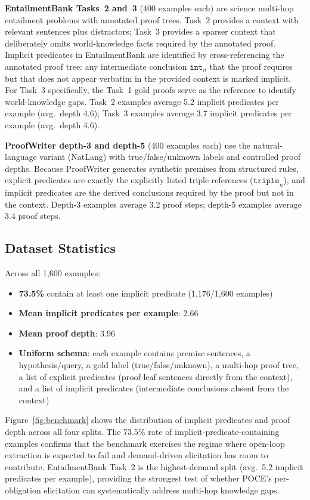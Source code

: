 \documentclass[11pt,letterpaper]{article}
\begin{document}
\textbf{EntailmentBank Tasks~2 and~3} \citep{Dalvi2021} (400 examples each) are science multi-hop
entailment problems with annotated proof trees. Task~2 provides a context with relevant sentences plus distractors; Task~3 provides a sparser context that deliberately omits world-knowledge facts required by the annotated proof. Implicit predicates
in EntailmentBank are identified by cross-referencing the annotated proof tree: any intermediate conclusion $\texttt{int}_n$
that the proof requires but that does not appear verbatim in the provided context is marked implicit. For Task~3 specifically,
the Task~1 gold proofs serve as the reference to identify world-knowledge gaps. Task~2 examples average 5.2 implicit predicates
per example (avg.\ depth 4.6); Task~3 examples average 3.7 implicit predicates per example (avg.\ depth 4.6).

\textbf{ProofWriter depth-3 and depth-5} \citep{Tafjord2020} (400 examples each) use the natural-language variant (NatLang) with true/false/unknown labels
and controlled proof depths. Because ProofWriter generates synthetic premises from structured rules, explicit predicates
are exactly the explicitly listed triple references ($\texttt{triple}_n$), and implicit predicates are the derived conclusions
required by the proof but not in the context. Depth-3 examples average 3.2 proof steps; depth-5 examples average 3.4 proof
steps.

\subsection{Dataset Statistics}

Across all 1,600 examples:
\begin{itemize}
  \item \textbf{73.5\%} contain at least one implicit predicate (1,176/1,600 examples)
  \item \textbf{Mean implicit predicates per example}: 2.66
  \item \textbf{Mean proof depth}: 3.96
  \item \textbf{Uniform schema}: each example contains premise sentences, a hypothesis/query, a gold label (true/false/unknown), a multi-hop proof tree, a list of explicit predicates (proof-leaf sentences directly from the context), and a list of implicit predicates (intermediate conclusions absent from the context)
\end{itemize}

Figure~\ref{fig:benchmark} shows the distribution of implicit predicates and proof depth across all four splits. The 73.5\% rate of implicit-predicate-containing examples confirms that the benchmark
exercises the regime where open-loop extraction is expected to fail and demand-driven elicitation has room to contribute.
EntailmentBank Task~2 is the highest-demand split (avg.\ 5.2 implicit predicates per example), providing the strongest
test of whether POCE's per-obligation elicitation can systematically address multi-hop knowledge gaps.
\end{document}
